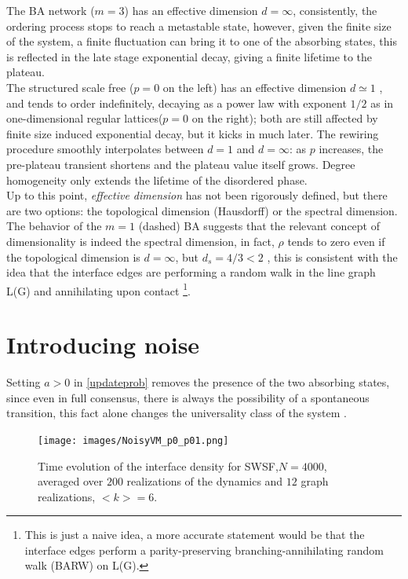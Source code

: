 The BA network ($m=3$) has an effective dimension $d=\infty$, consistently, the ordering process stops to reach a metastable state, however, given the finite size of the system, a finite fluctuation can bring it to one of the absorbing states, this is reflected in the late stage exponential decay, giving a finite lifetime to the plateau.\\
The structured scale free ($p=0$ on the left) has an effective dimension $d\simeq1$ \cite{suchecki2005voter}, and tends to order indefinitely, decaying as a power law with exponent $1/2$ as in one-dimensional regular lattices($p=0$ on the right); both are still affected by finite size induced exponential decay, but it kicks in much later.
The rewiring procedure smoothly interpolates between $d=1$ and $d=\infty$: as $p$ increases, the pre-plateau transient shortens and the plateau value itself grows. Degree homogeneity only extends the lifetime of the disordered phase.\\
Up to this point, \emph{effective dimension} has not been rigorously defined, but there are two options: the topological dimension (Hausdorff) or the spectral dimension. The behavior of the $m=1$ (dashed) BA suggests that the relevant concept of dimensionality is indeed the spectral dimension, in fact, $\rho$ tends to zero even if the topological dimension is $d=\infty$, but $d_s = 4/3 <2$ \cite{burda2001statistical}, this is consistent with the idea that the interface edges are performing a random walk in the line graph L(G) and annihilating upon contact \footnote{This is just a naive idea, a more accurate statement would be that the interface edges perform a parity-preserving branching-annihilating random walk (BARW) on L(G).}.

\section{Introducing noise}
Setting $a>0$ in \ref{updateprob} removes the presence of the two absorbing states, since even in full consensus, there is always the possibility of a spontaneous transition, this fact alone changes the universality class of the system \cite{livi2017nonequilibrium}.

\begin{figure}[htbp]
\label{fig:vm comparison}
  \centering
  \texttt{[image: images/NoisyVM\_p0\_p01.png]}
  \caption{Time evolution of the interface density for SWSF,$N=4000$, averaged over $200$ realizations of the dynamics and $12$ graph realizations, $<k> = 6$.}
  \label{fig:yourlabel}
\end{figure}

